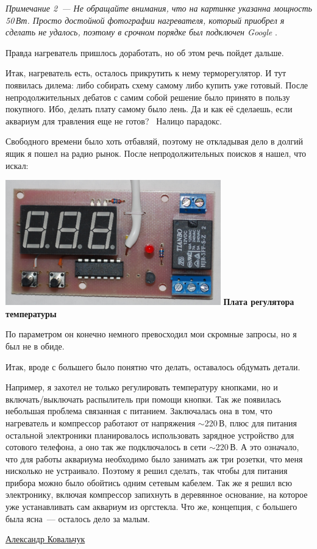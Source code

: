 {\emph{Примечание 2\ --- Не обращайте внимания, что на картинке указанна
мощность 50\,Вт. Просто достойной фотографии нагревателя, который
приобрел я сделать не удалось, поэтому в срочном порядке был подключен
Google \smiley}.

Правда нагреватель пришлось доработать, но об этом речь пойдет дальше.

Итак, нагреватель есть, осталось прикрутить к нему терморегулятор. И тут
появилась дилема: либо собирать схему самому либо купить уже готовый.
После непродолжительных дебатов с самим собой решение было принято в пользу
покупного. Ибо, делать плату самому было лень. Да и как её сделаешь, если
аквариум для травления еще не готов? \smiley\ Налицо парадокс. \smiley

Свободного времени было хоть отбавляй, поэтому не откладывая дело в долгий ящик
я пошел на радио рынок. После непродолжительных поисков я нашел, что искал:

\noindent\includegraphics[width=0.7\textwidth]{00/fig/smit/ee000024.png}
\textbf{Плата регулятора температуры}

По параметром он конечно немного превосходил мои скромные запросы, но я был не в
обиде.

Итак, вроде с большего было понятно что делать, оставалось обдумать детали.

Например, я захотел не только регулировать температуру кнопками, но и
включать/выключать распылитель при помощи кнопки. Так же появилась небольшая
проблема связанная с питанием. Заключалась она в том, что нагреватель и
компрессор работают от напряжения $\sim$220\,В, плюс для питания остальной
электроники планировалось использовать зарядное устройство для сотового
телефона, а оно так же подключалось в сети $\sim$220\,В. А это означало, что для
работы аквариума необходимо было занимать аж три розетки, что меня нисколько не
устраивало. Поэтому я решил сделать, так чтобы для питания прибора можно было
обойтись одним сетевым кабелем. Так же я решил всю электронику, включая
компрессор запихнуть в деревянное основание, на которое уже устанавливать сам
аквариум из оргстекла. Что же, концепция, с большего была ясна\ --- осталось
дело за малым. \smiley

}{\href{mailto:zamuhrishka\@inbox.ru}{Александр Ковальчук}}
